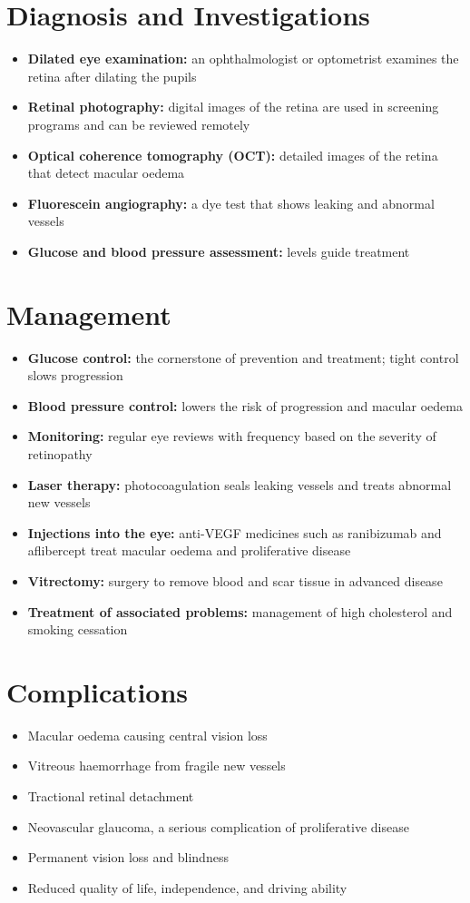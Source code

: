 \section*{Diagnosis and Investigations}
\begin{itemize}
    \item \textbf{Dilated eye examination:} an ophthalmologist or optometrist examines the retina after dilating the pupils
    \item \textbf{Retinal photography:} digital images of the retina are used in screening programs and can be reviewed remotely
    \item \textbf{Optical coherence tomography (OCT):} detailed images of the retina that detect macular oedema
    \item \textbf{Fluorescein angiography:} a dye test that shows leaking and abnormal vessels
    \item \textbf{Glucose and blood pressure assessment:} levels guide treatment
\end{itemize}

\section*{Management}
\begin{itemize}
    \item \textbf{Glucose control:} the cornerstone of prevention and treatment; tight control slows progression
    \item \textbf{Blood pressure control:} lowers the risk of progression and macular oedema
    \item \textbf{Monitoring:} regular eye reviews with frequency based on the severity of retinopathy
    \item \textbf{Laser therapy:} photocoagulation seals leaking vessels and treats abnormal new vessels
    \item \textbf{Injections into the eye:} anti-VEGF medicines such as ranibizumab and aflibercept treat macular oedema and proliferative disease
    \item \textbf{Vitrectomy:} surgery to remove blood and scar tissue in advanced disease
    \item \textbf{Treatment of associated problems:} management of high cholesterol and smoking cessation
\end{itemize}

\section*{Complications}
\begin{itemize}
    \item Macular oedema causing central vision loss
    \item Vitreous haemorrhage from fragile new vessels
    \item Tractional retinal detachment
    \item Neovascular glaucoma, a serious complication of proliferative disease
    \item Permanent vision loss and blindness
    \item Reduced quality of life, independence, and driving ability
\end{itemize}


